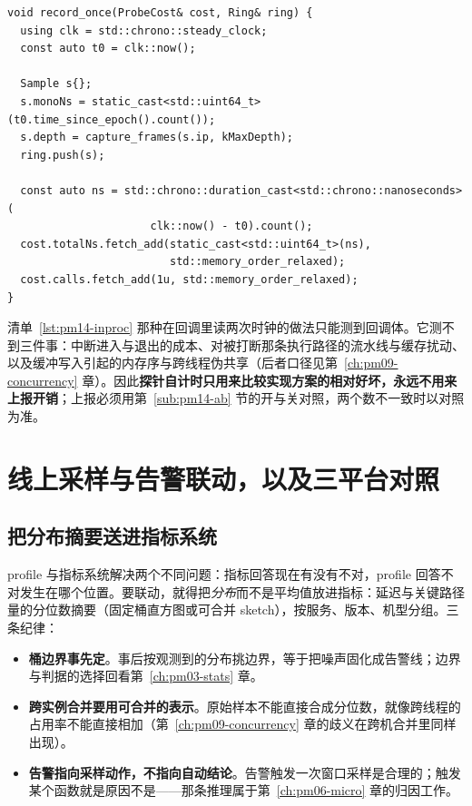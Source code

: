 \documentclass[12pt,a4paper,fontset=fandol]{ctexbook}
\begin{document}
\begin{lstlisting}[style=cppstyle, caption={应用内自采的最小骨架：固定内存环形缓冲与回调自计时（不含实测值；信号上下文的安全性与展开库实现有关，必须实测）}, label={lst:pm14-inproc}]
void record_once(ProbeCost& cost, Ring& ring) {
  using clk = std::chrono::steady_clock;
  const auto t0 = clk::now();

  Sample s{};
  s.monoNs = static_cast<std::uint64_t>(t0.time_since_epoch().count());
  s.depth = capture_frames(s.ip, kMaxDepth);
  ring.push(s);

  const auto ns = std::chrono::duration_cast<std::chrono::nanoseconds>(
                      clk::now() - t0).count();
  cost.totalNs.fetch_add(static_cast<std::uint64_t>(ns),
                         std::memory_order_relaxed);
  cost.calls.fetch_add(1u, std::memory_order_relaxed);
}
\end{lstlisting}

\begin{warning}[title={回调自计时会系统性低估开销}]
\label{box:pm14-selftime}
清单~\ref{lst:pm14-inproc} 那种在回调里读两次时钟的做法只能测到回调体。它测不到三件事：中断进入与退出的成本、对被打断那条执行路径的流水线与缓存扰动、以及缓冲写入引起的内存序与跨线程伪共享（后者口径见第~\ref{ch:pm09-concurrency} 章）。因此\textbf{探针自计时只用来比较实现方案的相对好坏，永远不用来上报开销}；上报必须用第~\ref{sub:pm14-ab} 节的开与关对照，两个数不一致时以对照为准。
\end{warning}

\section{线上采样与告警联动，以及三平台对照}
\label{sec:pm14-linkage}

\subsection{把分布摘要送进指标系统}
\label{sub:pm14-metrics}

profile 与指标系统解决两个不同问题：指标回答现在有没有不对，profile 回答不对发生在哪个位置。要联动，就得把\emph{分布}而不是平均值放进指标：延迟与关键路径量的分位数摘要（固定桶直方图或可合并 sketch），按服务、版本、机型分组。三条纪律：

\begin{itemize}
  \item \textbf{桶边界事先定}。事后按观测到的分布挑边界，等于把噪声固化成告警线；边界与判据的选择回看第~\ref{ch:pm03-stats} 章。
  \item \textbf{跨实例合并要用可合并的表示}。原始样本不能直接合成分位数，就像跨线程的占用率不能直接相加（第~\ref{ch:pm09-concurrency} 章的歧义在跨机合并里同样出现）。
  \item \textbf{告警指向采样动作，不指向自动结论}。告警触发一次窗口采样是合理的；触发某个函数就是原因不是——那条推理属于第~\ref{ch:pm06-micro} 章的归因工作。
\end{itemize}
\end{document}
